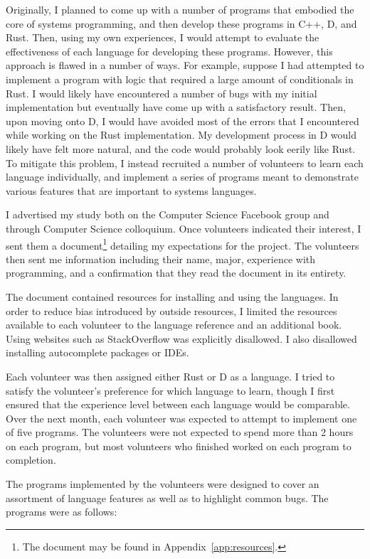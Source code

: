 \documentclass[finalcopy]{srpaper}
\begin{document}
Originally, I planned to come up with a number of programs that embodied the
core of systems programming, and then develop these programs in C++, D, and
Rust. Then, using my own experiences, I would attempt to evaluate the
effectiveness of each language for developing these programs. However, this
approach is flawed in a number of ways. For example, suppose I had attempted to
implement a program with logic that required a large amount of conditionals in
Rust. I would likely have encountered a number of bugs with my initial
implementation but eventually have come up with a satisfactory result. Then,
upon moving onto D, I would have avoided most of the errors that I encountered
while working on the Rust implementation. My development process in D would
likely have felt more natural, and the code would probably look eerily like
Rust. To mitigate this problem, I instead recruited a number of volunteers to
learn each language individually, and implement a series of programs meant to
demonstrate various features that are important to systems languages.

I advertised my study both on the Computer Science Facebook group and through
Computer Science colloquium. Once volunteers indicated their interest, I sent
them a document\footnote{The document may be found in
Appendix~\ref{app:resources}.} detailing my expectations for the project. The
volunteers then sent me information including their name, major, experience
with programming, and a confirmation that they read the document in its
entirety.

The document contained resources for installing and using the languages. In
order to reduce bias introduced by outside resources, I limited the resources
available to each volunteer to the language reference and an additional book.
Using websites such as StackOverflow was explicitly disallowed. I also
disallowed installing autocomplete packages or IDEs.

Each volunteer was then assigned either Rust or D as a language. I tried to
satisfy the volunteer's preference for which language to learn, though I first
ensured that the experience level between each language would be comparable.
Over the next month, each volunteer was expected to attempt to implement one of
five programs. The volunteers were not expected to spend more than 2 hours on
each program, but most volunteers who finished worked on each program to
completion.

The programs implemented by the volunteers were designed to cover an
assortment of language features as well as to highlight common bugs. The
programs were as follows:
\end{document}
